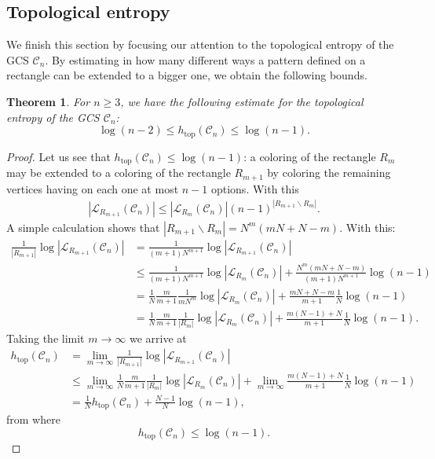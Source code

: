 \documentclass[letterpaper,10pt]{amsart}
\theoremstyle{plain}
\newtheorem{theorem}{Theorem}[section]
\def\htop{h_{\mathrm{top}}}
\begin{document}
	
\subsection{Topological entropy}
We finish this section by focusing our attention to the topological entropy of the GCS $\mathcal{C}_n$. By estimating in how many different ways a pattern defined on a rectangle can be extended to a bigger one, we obtain the following bounds.
\begin{theorem}\label{thm:gcs_entropy_estimates} For $n\ge 3$, we have the following estimate for the topological entropy of the GCS $\mathcal{C}_n$:
	$$
	\log(n-2)\le \htop(\mathcal{C}_n)\le \log(n-1).
	$$
\end{theorem}
\begin{proof}
	Let us see that $\htop(\mathcal{C}_n)\le \log(n-1)$: a coloring of the rectangle $R_m$ may be extended to a coloring of the rectangle $R_{m+1}$ by coloring the remaining vertices having on each one at most $n-1$ options. With this
	\begin{align*}
	|\mathcal{L}_{R_{m+1}}(\mathcal{C}_n)|\le |\mathcal{L}_{R_m}(\mathcal{C}_{n})|(n-1)^{|R_{m+1}\backslash R_m|}.
	\end{align*}
	A simple calculation shows that $|R_{m+1}\backslash R_{m}|=N^m(mN+N-m)$. 
	With this:
	\begin{align*}
	\frac{1}{|R_{m+1}|}\log|\mathcal{L}_{R_{m+1}}(\mathcal{C}_n)|&=\frac{1}{(m+1)N^{m+1}}\log|\mathcal{L}_{R_{m+1}}(\mathcal{C}_n)|\\
	&\le \frac{1}{(m+1)N^{m+1}}\log|\mathcal{L}_{R_m}(\mathcal{C}_{n})|+\frac{N^m(mN+N-m)}{(m+1)N^{m+1}}\log(n-1)\\
	&=\frac{1}{N}\frac{m}{m+1}\frac{1}{mN^{m}}\log|\mathcal{L}_{R_m}(\mathcal{C}_{n})|+ \frac{mN+N-m}{m+1}\frac{1}{N}\log(n-1)\\
	&=\frac{1}{N}\frac{m}{m+1}\frac{1}{|R_m|}\log|\mathcal{L}_{R_m}(\mathcal{C}_{n})|+ \frac{m(N-1)+N}{m+1}\frac{1}{N}\log(n-1).
	\end{align*}
	Taking the limit $m\to \infty$ we arrive at
	\begin{align*}
	\htop(\mathcal{C}_n)&=\lim_{m\to \infty }	\frac{1}{|R_{m+1}|}\log|\mathcal{L}_{R_{m+1}}(\mathcal{C}_n)|\\
	&\le \lim_{m\to \infty }\frac{1}{N}\frac{m}{m+1}\frac{1}{|R_m|}\log|\mathcal{L}_{R_m}(\mathcal{C}_{n})| +\lim_{m\to \infty }\frac{m(N-1)+N}{m+1}\frac{1}{N}\log(n-1)\\
	&= \frac{1}{N}\htop(\mathcal{C}_n)+\frac{N-1}{N}\log(n-1),
	\end{align*}
	from where 
	$$\htop(\mathcal{C}_n)\le \log(n-1).$$
	

\end{proof}
\end{document}

